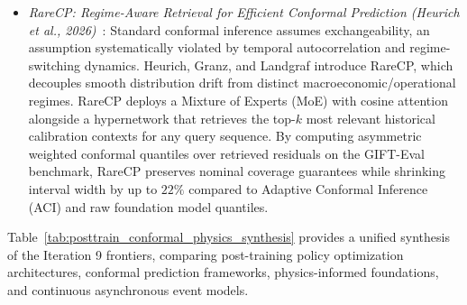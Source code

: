 \begin{itemize}[leftmargin=*]
    \item \emph{RareCP: Regime-Aware Retrieval for Efficient Conformal Prediction (Heurich et al., 2026)}~\cite{heurich2026rarecp}: Standard conformal inference assumes exchangeability, an assumption systematically violated by temporal autocorrelation and regime-switching dynamics. Heurich, Granz, and Landgraf introduce RareCP, which decouples smooth distribution drift from distinct macroeconomic/operational regimes. RareCP deploys a Mixture of Experts (MoE) with cosine attention alongside a hypernetwork that retrieves the top-$k$ most relevant historical calibration contexts for any query sequence. By computing asymmetric weighted conformal quantiles over retrieved residuals on the GIFT-Eval benchmark, RareCP preserves nominal coverage guarantees while shrinking interval width by up to $22\%$ compared to Adaptive Conformal Inference (ACI) and raw foundation model quantiles.
\end{itemize}

Table~\ref{tab:posttrain_conformal_physics_synthesis} provides a unified synthesis of the Iteration 9 frontiers, comparing post-training policy optimization architectures, conformal prediction frameworks, physics-informed foundations, and continuous asynchronous event models.

